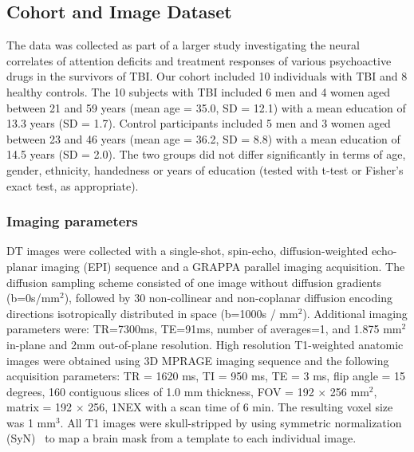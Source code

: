 \subsection{Cohort and Image Dataset}
The data was collected as part of a larger study investigating the neural correlates of attention deficits and treatment responses of
various psychoactive drugs in the survivors of TBI.  Our cohort included 10 individuals with TBI and 8 healthy controls. The 10 subjects with TBI included 6 men and 4 women aged between 21 and 59 years (mean age = 35.0, SD = 12.1) with a mean education of 13.3 years (SD = 1.7).  Control participants included 5 men and 3 women aged between 23 and 46 years (mean age = 36.2, SD = 8.8) with a mean education of 14.5 years (SD = 2.0).  The two groups did not differ significantly in terms of age, gender, ethnicity, handedness or years of education (tested with t-test or Fisher's exact test, as appropriate).

\subsubsection{Imaging parameters}
DT images were collected with a single-shot, spin-echo, diffusion-weighted echo-planar imaging (EPI) sequence and a GRAPPA parallel imaging acquisition.  The diffusion sampling scheme consisted of one image without diffusion gradients (b=0s/mm$^2$), followed by 30
non-collinear and non-coplanar diffusion encoding directions isotropically distributed in space (b=1000s / mm$^2$).  Additional imaging parameters were: TR=7300ms, TE=91ms, number of averages=1, and 1.875 mm$^2$ in-plane and 2mm out-of-plane resolution. High resolution T1-weighted anatomic images were obtained using 3D MPRAGE imaging sequence and the following acquisition parameters: TR = 1620 ms, TI = 950 ms, TE = 3 ms, flip angle = 15 degrees, 160 contiguous slices of 1.0 mm thickness, FOV = 192 $\times$ 256 mm$^2$, matrix = 192 $\times$ 256, 1NEX with a scan time of 6 min. The resulting voxel size was 1 mm$^3$.  All T1 images were skull-stripped by using symmetric normalization (SyN)~\cite{Avants2008} to map a brain mask from a template to each individual image.

